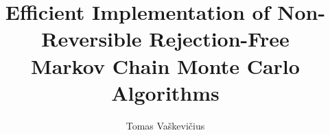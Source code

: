 \documentclass[12pt]{ociamthesis}
\title{\vspace{-0.4cm}Efficient Implementation of Non-Reversible Rejection-Free \\
       Markov Chain Monte Carlo Algorithms}
\author{Tomas Vaškevičius}
\begin{document}
\maketitle

\setcounter{tocdepth}{1}
\begin{romanpages}
\tableofcontents
\end{romanpages}



\appendix

\cleardoublepage
{}
\renewcommand{\bibname}{References}

\end{document}

